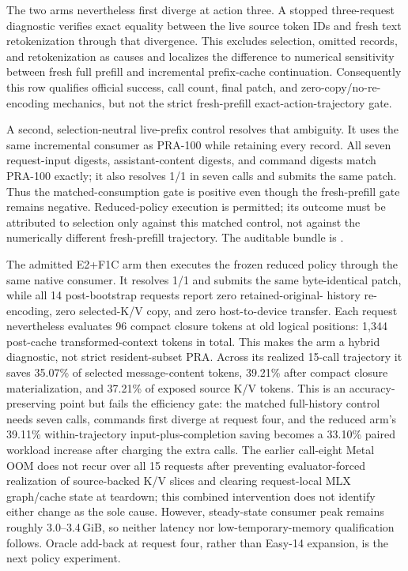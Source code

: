 \documentclass[11pt]{article}
\begin{document}
The two arms nevertheless first diverge at action three.  A stopped
three-request diagnostic verifies exact equality between the live source token
IDs and fresh text retokenization through that divergence.  This excludes
selection, omitted records, and retokenization as causes and localizes the
difference to numerical sensitivity between fresh full prefill and incremental
prefix-cache continuation.  Consequently this row qualifies official success,
call count, final patch, and zero-copy/no-re-encoding mechanics, but not the
strict fresh-prefill exact-action-trajectory gate.

A second, selection-neutral live-prefix control resolves that ambiguity.  It
uses the same incremental consumer as PRA-100 while retaining every record.
All seven request-input digests, assistant-content digests, and command digests
match PRA-100 exactly; it also resolves 1/1 in seven calls and submits the same
patch.  Thus the matched-consumption gate is positive even though the
fresh-prefill gate remains negative.  Reduced-policy execution is permitted;
its outcome must be attributed to selection only against this matched control,
not against the numerically different fresh-prefill trajectory.  The auditable
bundle is
.

The admitted E2+F1C arm then executes the frozen reduced policy through the
same native consumer.  It resolves 1/1 and submits the same byte-identical
patch, while all 14 post-bootstrap requests report zero retained-original-
history re-encoding, zero selected-K/V copy, and zero host-to-device transfer.
Each request nevertheless evaluates 96 compact closure tokens at old logical
positions: 1,344 post-cache transformed-context tokens in total.  This makes the
arm a hybrid diagnostic, not strict resident-subset PRA.  Across
its realized 15-call trajectory it saves 35.07\% of selected message-content
tokens, 39.21\% after compact closure materialization, and 37.21\% of exposed
source K/V tokens.  This is an accuracy-preserving point but fails the
efficiency gate: the matched full-history control needs seven calls, commands
first diverge at request four, and the reduced arm's 39.11\% within-trajectory
input-plus-completion saving becomes a 33.10\% paired workload increase after
charging the extra calls.  The earlier call-eight Metal OOM does not recur over
all 15 requests after preventing evaluator-forced realization of source-backed
K/V slices and clearing request-local MLX graph/cache state at teardown; this
combined intervention does not identify either change as the sole cause.
However, steady-state consumer peak remains roughly 3.0--3.4\,GiB, so neither
latency nor low-temporary-memory qualification follows.  Oracle add-back at
request four, rather than Easy-14 expansion, is the next policy experiment.
\end{document}
